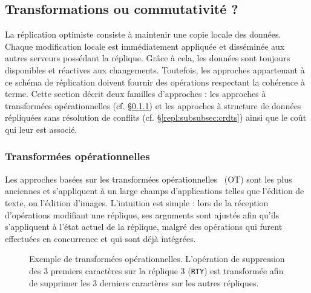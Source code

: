 \subsection{Transformations ou commutativité ?}
\label{repl:subsec:otorcrdts}

La réplication optimiste consiste à maintenir une copie locale des
données. Chaque modification locale est immédiatement appliquée et disséminée
aux autres serveurs possédant la réplique. Grâce à cela, les données sont
toujours disponibles et réactives aux changements. Toutefois, les approches
appartenant à ce schéma de réplication doivent fournir des opérations respectant
la cohérence à terme. Cette section décrit deux familles d'approches : les
approches à transformées opérationnelles (cf. §\ref{repl:subsubsec:ot}) et les
approches à structure de données répliquées sans résolution de conflits
(cf. §\ref{repl:subsubsec:crdts}) ainsi que le coût qui leur est associé.

\subsubsection{Transformées opérationnelles}
\label{repl:subsubsec:ot}

Les approches basées sur les transformées
opérationnelles~\cite{sun1998operational, sun2009contextbased} (OT) sont les
plus anciennes et s'appliquent à un large champs d'applications telles que
l'édition de texte, ou l'édition d'images. L'intuition est simple : lors de la
réception d'opérations modifiant une réplique, ses arguments sont ajustés afin
qu'ils s'appliquent à l'état actuel de la réplique, malgré des opérations qui
furent effectuées en concurrence et qui sont déjà intégrées.

\begin{figure}
  \centering
  
  \caption[Exemple de transformées opérationnelles] {\label{repl:fig:otexample}
    Exemple de transformées opérationnelles. L'opération de suppression des 3
    premiers caractères sur la réplique 3 (\texttt{RTY}) est transformée afin de
    supprimer les 3 derniers caractères sur les autres répliques.}
\end{figure}

